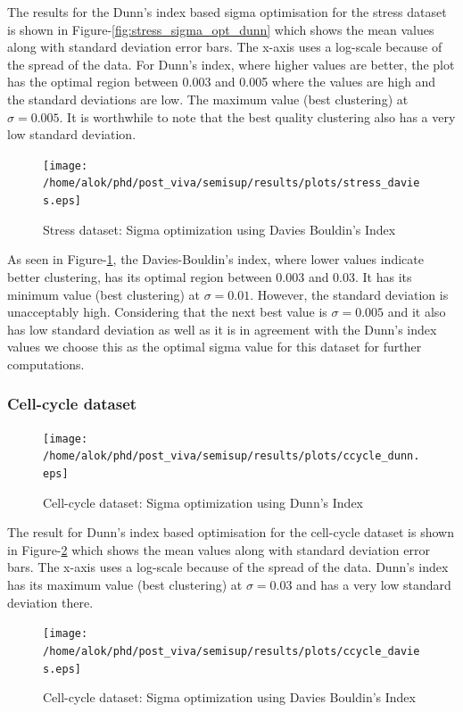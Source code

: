 The results for the Dunn's index based sigma optimisation for the stress dataset is shown in Figure-\ref{fig:stress_sigma_opt_dunn} which shows the mean values along with standard deviation error bars. 
The x-axis uses a log-scale because of the spread of the data.  For Dunn's index, where higher values are better, the plot has the optimal region between 0.003 and 0.005 where the values are high and the standard deviations are low.
The maximum value (best clustering) at $\sigma=0.005$. It is worthwhile to note that the best quality clustering also has a very low standard deviation.

\begin{figure}[tp]
 \centering
 \texttt{[image: /home/alok/phd/post\_viva/semisup/results/plots/stress\_davies.eps]}
 \caption{Stress dataset: Sigma optimization using Davies Bouldin's Index}
 \label{fig:stress_sigma_opt_dav}
\end{figure}

As seen in Figure-\ref{fig:stress_sigma_opt_dav}, the Davies-Bouldin's index, where lower values indicate better clustering, has its optimal region between 0.003 and 0.03. It has its minimum value (best clustering) at $\sigma=0.01$. However, the standard deviation is unacceptably high.
Considering that the next best value is $\sigma=0.005$ and it also has low standard deviation as well as it is in agreement with the Dunn's index values we choose this as the optimal sigma value for this dataset for further computations.  

\subsubsection{Cell-cycle dataset}

\begin{figure}[tp]
 \centering
 \texttt{[image: /home/alok/phd/post\_viva/semisup/results/plots/ccycle\_dunn.eps]}
 \caption{Cell-cycle dataset: Sigma optimization using Dunn's Index}
 \label{fig:ccycle_sigma_opt_dunn}
\end{figure}

The result for Dunn's index based optimisation for the cell-cycle dataset is shown in Figure-\ref{fig:ccycle_sigma_opt_dunn} which shows the mean values along with standard deviation error bars. 
The x-axis uses a log-scale because of the spread of the data.  Dunn's index has its maximum value (best clustering) at $\sigma=0.03$ and has a very low standard deviation there. 

\begin{figure}[tp]
 \centering
 \texttt{[image: /home/alok/phd/post\_viva/semisup/results/plots/ccycle\_davies.eps]}
 \caption{Cell-cycle dataset: Sigma optimization using Davies Bouldin's Index}
 \label{fig:ccycle_sigma_opt_dav}
\end{figure}

